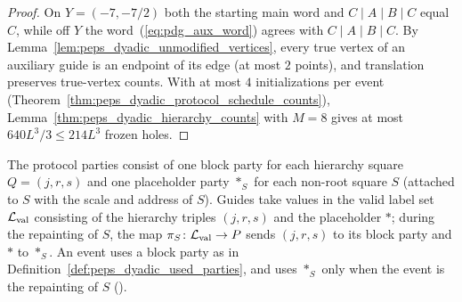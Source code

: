 \begin{proof}\leanok
    On $Y=(-7,-7/2)$ both the starting main word and $C\mid A\mid B\mid C$ equal
    $C$, while off $Y$ the word~(\ref{eq:pdg_aux_word}) agrees with
    $C\mid A\mid B\mid C$. By Lemma~\ref{lem:peps_dyadic_unmodified_vertices},
    every true vertex of an auxiliary guide is an endpoint of its edge (at most $2$
    points), and translation preserves true-vertex counts. With at most $4$
    initializations per event (Theorem~\ref{thm:peps_dyadic_protocol_schedule_counts}),
    Lemma~\ref{thm:peps_dyadic_hierarchy_counts} with $M=8$ gives at most
    $640L^3/3\le214L^3$ frozen holes.
\end{proof}

\begin{definition}
    \label{def:peps_dyadic_protocol_parties}
    \leanok
    The protocol parties consist of one block party for each hierarchy square
    $Q=(j,r,s)$ and one placeholder party $\ast_S$ for each non-root square $S$
    (attached to $S$ with the scale and address of $S$). Guides take values in the
    valid label set $\mathcal L_{\rm val}$ consisting of the hierarchy triples
    $(j,r,s)$ and the placeholder $\ast$; during the repainting of $S$, the map
    $\pi_S\colon\mathcal L_{\rm val}\to P$ sends $(j,r,s)$ to its block party and
    $\ast$ to $\ast_S$. An event uses a block party as in
    Definition~\ref{def:peps_dyadic_used_parties}, and uses $\ast_S$ only when the
    event is the repainting of $S$
    (\cite[Proposition~7.1, item~1; \texttt{06-geometry.tex}, lines 91--100, 627--643]{OpenAI2026PolynomialPEPS}).
\end{definition}

